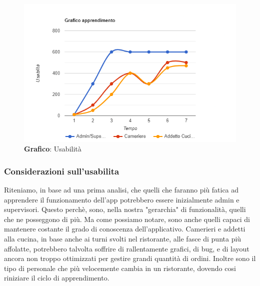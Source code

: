     \begin{figure}[H]
        \centering
        \includegraphics[scale=0.6]{assets/immagini varie/grafico usabilita.png}
        \caption{\textbf{Grafico}: Usabilità}\label{fig:Usabilità_graph}
    \end{figure}
    \vspace{0.5cm}
    \subsubsection*{Considerazioni sull'usabilita}
        \begin{flushleft}
            Riteniamo, in base ad una prima analisi, che quelli che faranno più fatica ad apprendere il funzionamento dell'app potrebbero essere inizialmente admin e supervisori.
            Questo perchè, sono, nella nostra "gerarchia" di funzionalità, quelli che ne posseggono di più. 
            Ma come possiamo notare, sono anche quelli capaci di mantenere costante il grado di conoscenza dell'applicativo.
            Camerieri e addetti alla cucina, in base anche ai turni svolti nel ristorante, alle fasce di punta più affolatte, potrebbero talvolta
            soffrire di rallentamente grafici, di bug, e di layout ancora non troppo ottimizzati per gestire grandi quantità di ordini.
            Inoltre sono il tipo di personale che più velocemente cambia in un ristorante, dovendo cosi riniziare il ciclo di apprendimento.
        \end{flushleft}